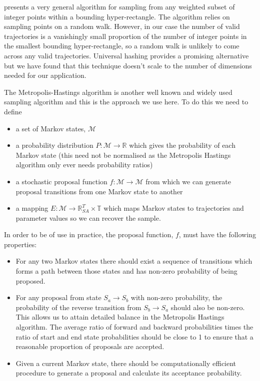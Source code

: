 \documentclass{article}
\begin{document}
\citet{baumert2009discrete} presents a very general algorithm for sampling from any weighted subset of integer points within a bounding hyper-rectangle. The algorithm relies on sampling points on a random walk. However, in our case the number of valid trajectories is a vanishingly small proportion of the number of integer points in the smallest bounding hyper-rectangle, so a random walk is unlikely to come across any valid trajectories. Universal hashing \citep{meel2016constrained} provides a promising alternative but we have found that this technique doesn't scale to the number of dimensions needed for our application.

The Metropolis-Hastings algorithm is another well known and widely used sampling algorithm and this is the approach we use here. To do this we need to define
\begin{itemize}
\item a set of Markov states, $\mathcal{M}$

\item a probability distribution $P: \mathcal{M} \to \mathbb{R}$ which gives the probability of each Markov state (this need not be normalised as the Metropolis Hastings algorithm only ever needs probability ratios)

\item a stochastic proposal function $f:\mathcal{M} \to \mathcal{M}$ from which we can generate proposal transitions from one Markov state to another

\item a mapping $E:\mathcal{M} \to \mathbb{R}^T_{SA} \times \mathbb{T}$ which maps Markov states to trajectories and parameter values so we can recover the sample.
\end{itemize}

In order to be of use in practice, the proposal function, $f$, must have the following properties:
\begin{itemize}
	\item For any two Markov states there should exist a sequence of transitions which forms a path between those states and has non-zero probability of being proposed.
	
	\item For any proposal from state $S_a \to S_b$ with non-zero probability, the probability of the reverse transition from $S_b \to S_a$ should also be non-zero. This allows us to attain detailed balance in the Metropolis Hastings algorithm. The average ratio of forward and backward probabilities times the ratio of start and end state probabilities should be close to 1 to ensure that a reasonable proportion of proposals are accepted.
	
	\item Given a current Markov state, there should be computationally efficient procedure to generate a proposal and calculate its acceptance probability. 
\end{itemize}
\end{document}
